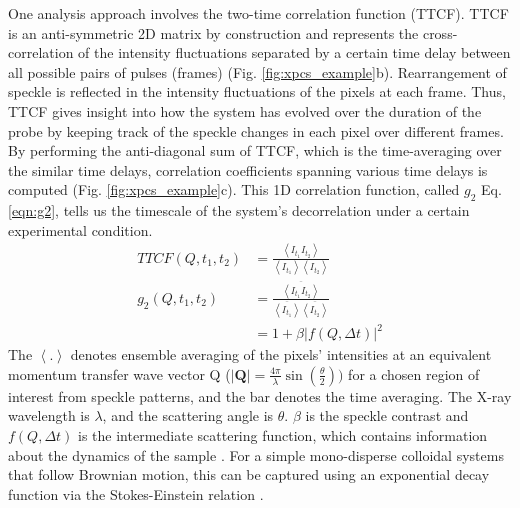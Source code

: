 \documentclass[11pt]{article}
\theoremstyle{definition}
\newcommand{\QQ}{\textbf{Q}}
\begin{document}
One analysis approach involves the two-time correlation function (TTCF). TTCF is an anti-symmetric 2D matrix by construction \cite{cao_effect_2020} and represents the cross-correlation of the intensity fluctuations separated by a certain time delay between all possible pairs of pulses (frames) (Fig. \ref{fig:xpcs_example}b). Rearrangement of speckle is reflected in the intensity fluctuations of the pixels at each frame. Thus, TTCF gives insight into how the system has evolved over the duration of the probe by keeping track of the speckle changes in each pixel over different frames. By performing the anti-diagonal sum of TTCF, which is the time-averaging over the similar time delays, correlation coefficients spanning various time delays is computed (Fig. \ref{fig:xpcs_example}c). This 1D correlation function, called \(g_2\) Eq. \ref{eqn:g2}, tells us the timescale of the system's decorrelation under a certain experimental condition. 
\begin{subequations}\label{eqn:TTCF_g2}
\begin{align}
\label{eqn:TTCF}
TTCF(Q, t_1, t_2) &= \frac{\left<I_{t_1} I_{t_2}\right>}{\left<I_{t_1}\right> \left<I_{t_2}\right>} \\
\label{eqn:g2}
g_2(Q, t_1, t_2) &= \frac{\overline{\left<{I}_{t_1} {I}_{t_2}\right>}}{\overline{\left<{I}_{t_1}\right>} \overline{\left<{I}_{t_2}\right>}} \\
&= 1 + \beta |f(Q, \Delta t)|^2
\end{align}
\end{subequations}
The $\left<.\right>$ denotes ensemble averaging of the pixels' intensities at an equivalent momentum transfer wave vector Q ($|\QQ| = \frac{4 \pi}{\lambda} \sin(\frac{\theta}{2}))$ for a chosen region of interest from speckle patterns, and the bar denotes the time averaging. The X-ray wavelength is $\lambda$, and the scattering angle is $\theta$. $\beta$ is the speckle contrast and $f(Q, \Delta t)$ is the intermediate scattering function, which contains information about the dynamics of the sample \cite{jo_single_2023}. For a simple mono-disperse colloidal systems that follow Brownian motion, this can be captured using an exponential decay function via the Stokes-Einstein relation \cite{jo_single_2023}.
\end{document}
